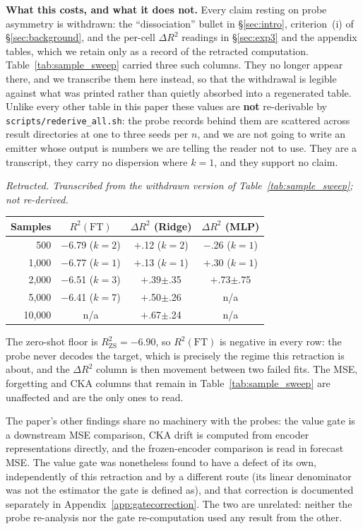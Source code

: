 \textbf{What this costs, and what it does not.} Every claim resting on probe
asymmetry is withdrawn: the ``dissociation'' bullet in
\S\ref{sec:intro}, criterion~(i) of \S\ref{sec:background}, and the
per-cell $\Delta R^2$ readings in \S\ref{sec:exp3} and the appendix
tables, which we retain only as a record of the retracted computation.
Table~\ref{tab:sample_sweep} carried three such columns.  They no longer appear
there, and we transcribe them here instead, so that the withdrawal is legible
against what was printed rather than quietly absorbed into a regenerated table.
Unlike every other table in this paper these values are \textbf{not}
re-derivable by \texttt{scripts/rederive\_all.sh}: the probe records behind them
are scattered across result directories at one to three seeds per $n$, and we
are not going to write an emitter whose output is numbers we are telling the
reader not to use.  They are a transcript, they carry no dispersion where
$k{=}1$, and they support no claim.

\begin{center}
\small
\emph{Retracted.  Transcribed from the withdrawn version of
Table~\ref{tab:sample_sweep}; not re-derived.}\\[3pt]
\begin{tabular}{@{}rccc@{}}
\toprule
Samples & $R^2(\text{FT})$ & $\Delta R^2$ (Ridge) & $\Delta R^2$ (MLP) \\
\midrule
500      & $-$6.79 ($k{=}2$) & $+$.12 ($k{=}2$)      & $-$.26 ($k{=}1$) \\
1{,}000  & $-$6.77 ($k{=}1$) & $+$.13 ($k{=}1$)      & $+$.30 ($k{=}1$) \\
2{,}000  & $-$6.51 ($k{=}3$) & $+$.39{\tiny$\pm$.35} & $+$.73{\tiny$\pm$.75} \\
5{,}000  & $-$6.41 ($k{=}7$) & $+$.50{\tiny$\pm$.26} & n/a \\
10{,}000 & n/a               & $+$.67{\tiny$\pm$.24} & n/a \\
\bottomrule
\end{tabular}
\end{center}

\noindent The zero-shot floor is $R^2_\text{ZS}{=}{-}6.90$, so $R^2(\text{FT})$
is negative in every row: the probe never decodes the target, which is precisely
the regime this retraction is about, and the $\Delta R^2$ column is then
movement between two failed fits.  The MSE, forgetting and CKA columns that
remain in Table~\ref{tab:sample_sweep} are unaffected and are the only ones to
read.

The paper's other findings share no machinery with the probes: the value gate
is a downstream MSE comparison, CKA drift is computed from encoder
representations directly, and the frozen-encoder comparison is read in
forecast MSE.  The value gate was nonetheless found to have a defect of its
own, independently of this retraction and by a different route (its linear
denominator was not the estimator the gate is defined as), and that correction
is documented separately in Appendix~\ref{app:gatecorrection}.  The two are
unrelated: neither the probe re-analysis nor the gate re-computation used any
result from the other.


